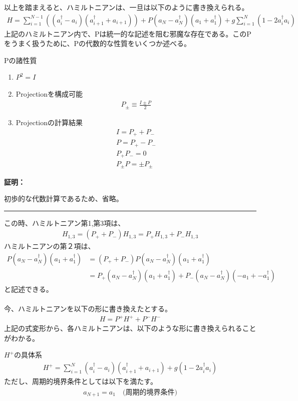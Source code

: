 \documentclass[a4paper,10.5pt]{article}
\numberwithin{equation}{section}
\newenvironment{proofbox}
{\begin{prooflabel}\textbf{証明：}\end{prooflabel}\vspace{0.8em}}
{\par\vspace{1em}\hrule\vspace{1em}}
\begin{document}
以上を踏まえると、ハミルトニアンは、一旦は以下のように書き換えられる。
\begin{align*}
    H=\sum_{i=1}^{N-1} ((a_{i}^{\dagger}-a_{i})(a_{i+1}^{\dagger}+a_{i+1}))+P(a_{N}-a_{N}^{\dagger})(a_{1}+a_{1}^{\dagger})+g\sum_{i=1}^{N}(1-2a_{i}^{\dagger}a_{i})
\end{align*}
上記のハミルトニアン内で、Pは統一的な記述を阻む邪魔な存在である。このPをうまく扱うために、Pの代数的な性質をいくつか述べる。
\begin{resultbox}{Pの諸性質}
    \begin{enumerate}
        \item $P^{2}=I$
        \item Projectionを構成可能
        \begin{align*}
            P_{\pm}\equiv \frac{I\pm P}{2}
        \end{align*}     
        \item Projectionの計算結果
        \begin{align*}
            I=P_{+}+P_{-}\\
            P=P_{+}-P_{-}\\
            P_{+}P_{-}=0\\
            P_{\pm}P=\pm P_{\pm}
        \end{align*}
    \end{enumerate}
\end{resultbox}
\begin{proofbox}
    初歩的な代数計算であるため、省略。
\end{proofbox}
この時、ハミルトニアン第1,第3項は、
\begin{align*}
    H_{1,3}=(P_{+}+P_{-})H_{1,3}=P_{+}H_{1,3}+P_{-}H_{1,3}
\end{align*}
ハミルトニアンの第２項は、
\begin{align*}
    P(a_{N}-a_{N}^{\dagger})(a_{1}+a_{1}^{\dagger})&=(P_{+}+P_{-})P
    (a_{N}-a_{N}^{\dagger})(a_{1}+a_{1}^{\dagger})\\
    &=P_{+}(a_{N}-a_{N}^{\dagger})(a_{1}+a_{1}^{\dagger})+P_{-}(a_{N}-a_{N}^{\dagger})(-a_{1}+-a_{1}^{\dagger})
\end{align*}
と記述できる。\\
\\
今、ハミルトニアンを以下の形に書き換えたとする。
\begin{align*}
    H=P^{+}H^{+}+P^{-}H^{-}
\end{align*}
上記の式変形から、各ハミルトニアンは、以下のような形に書き換えられることがわかる。
\begin{resultbox}{$H^{+}$の具体系}
    \begin{align*}
        H^{+}=\sum_{i=1}^{N}(a_{i}^{\dagger}-a_{i})(a_{i+1}^{\dagger}+a_{i+1})+g(1-2a^{\dagger}_{i}a_{i})
    \end{align*}
    ただし、周期的境界条件としては以下を満たす。
    \begin{align*}
        a_{N+1}=a_{1}\quad \text{(周期的境界条件)}
    \end{align*}
\end{resultbox}
\end{document}
